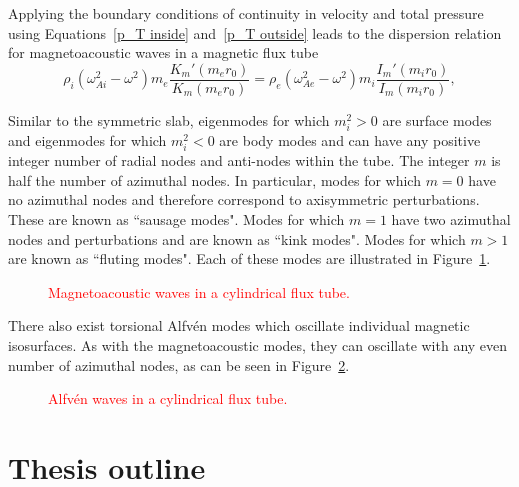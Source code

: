 \documentclass[12pt]{../style-files/ociamthesis}
\begin{document}
Applying the boundary conditions of continuity in velocity and total pressure using Equations~\eqref{p_T inside} and~\eqref{p_T outside} leads to the dispersion relation for magnetoacoustic waves in a magnetic flux tube
\begin{equation}
\rho_i(\omega_{Ai}^2 - \omega^2)m_e\frac{K_m'(m_er_0)}{K_m(m_er_0)} = \rho_e(\omega_{Ae}^2 - \omega^2)m_i\frac{I_m'(m_ir_0)}{I_m(m_ir_0)},
\end{equation}

Similar to the symmetric slab, eigenmodes for which $m_i^2 > 0$ are surface modes and eigenmodes for which $m_i^2 < 0$ are body modes and can have any positive integer number of radial nodes and anti-nodes within the tube. The integer $m$ is half the number of azimuthal nodes. In particular, modes for which $m = 0$ have no azimuthal nodes and therefore correspond to axisymmetric perturbations. These are known as ``sausage modes". Modes for which $m = 1$ have two azimuthal nodes and perturbations and are known as ``kink modes". Modes for which $m > 1$ are known as ``fluting modes". Each of these modes are illustrated in Figure~\ref{fig: magnetoacoustic waves flux tube}.
\begin{figure}
	\caption{\textcolor{red}{Magnetoacoustic waves in a cylindrical flux tube.}}
	\label{fig: magnetoacoustic waves flux tube}
\end{figure}

There also exist torsional Alfv\'{e}n modes which oscillate individual magnetic isosurfaces. As with the magnetoacoustic modes, they can oscillate with any even number of azimuthal nodes, as can be seen in Figure~\ref{fig: alvfen modes flux tube}.
\begin{figure}
	\caption{\textcolor{red}{Alfv\'{e}n waves in a cylindrical flux tube.}}
	\label{fig: alvfen modes flux tube}
\end{figure}



\section{Thesis outline}
\label{sec:outline}



  
\end{document}
